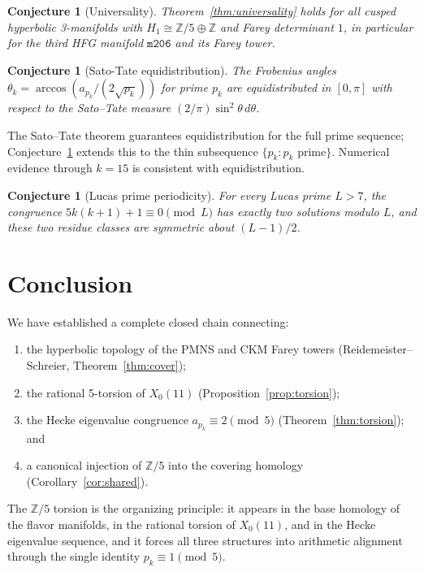 \documentclass[11pt,a4paper]{article}
\newtheorem{conjecture}[theorem]{Conjecture}
\theoremstyle{definition}
\newcommand{\ZZ}{\mathbb{Z}}
\newcommand{\pk}{p_k}
\newcommand{\Xo}{X_0(11)}
\begin{document}
\begin{conjecture}[Universality]
\label{conj:universal}
Theorem~\ref{thm:universality} holds for all cusped hyperbolic
3-manifolds with $H_1 \cong \ZZ/5 \oplus \ZZ$ and Farey
determinant $1$, in particular for the third HFG manifold
$\texttt{m206}$ and its Farey tower.
\end{conjecture}

\begin{conjecture}[Sato-Tate equidistribution]
\label{conj:st}
The Frobenius angles $\theta_k = \arccos(a_{\pk}/(2\sqrt{\pk}))$
for prime $\pk$ are equidistributed in $[0, \pi]$ with respect
to the Sato--Tate measure $(2/\pi)\sin^2\theta\, d\theta$.
\end{conjecture}

The Sato--Tate theorem \cite{CHST2008} guarantees equidistribution
for the full prime sequence; Conjecture~\ref{conj:st} extends this
to the thin subsequence $\{\pk : \pk \text{ prime}\}$.
Numerical evidence through $k = 15$ is consistent with
equidistribution.

\begin{conjecture}[Lucas prime periodicity]
For every Lucas prime $L > 7$, the congruence
$5k(k+1)+1 \equiv 0 \pmod{L}$ has exactly two solutions
modulo $L$, and these two residue classes are symmetric about
$(L-1)/2$.
\end{conjecture}

\section{Conclusion}
\label{sec:conclusion}

We have established a complete closed chain connecting:
\begin{enumerate}
\item the hyperbolic topology of the PMNS and CKM Farey towers
      (Reidemeister--Schreier, Theorem~\ref{thm:cover});
\item the rational 5-torsion of $\Xo$
      (Proposition~\ref{prop:torsion});
\item the Hecke eigenvalue congruence $a_{\pk} \equiv 2 \pmod{5}$
      (Theorem~\ref{thm:torsion}); and
\item a canonical injection of $\ZZ/5$ into the covering homology
      (Corollary~\ref{cor:shared}).
\end{enumerate}
The $\ZZ/5$ torsion is the organizing principle: it appears in
the base homology of the flavor manifolds, in the rational torsion
of $\Xo$, and in the Hecke eigenvalue sequence, and it forces all
three structures into arithmetic alignment through the single identity
$\pk \equiv 1 \pmod{5}$.
\end{document}

